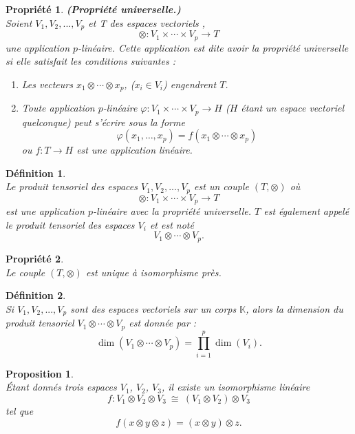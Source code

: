\documentclass[a4paper, 14pt]{report}
\newtheorem{definition}{Définition}[section]
\newtheorem{proposition}{Proposition}[section]
\newtheorem{propriety}{Propriété}[section]
\begin{document}
\begin{onehalfspace}
{\begin{propriety}\textbf{(Propriété universelle.)} \cite{greub2012linear}\\
Soient \( V_1, V_2, ... ,V_p \) et T des espaces vectoriels , 
	\[
	\otimes : V_1 \times \cdots \times V_p \to T
	\]
	une application \( p \)-linéaire. Cette application est dite avoir la \textit{propriété universelle} si elle satisfait les conditions suivantes :
	\begin{enumerate} [label=\roman*)]
		\item Les vecteurs \( x_1 \otimes \cdots \otimes x_p \), (\( x_i \in V_i \)) engendrent \( T \).
		\item Toute application \( p \)-linéaire \( \varphi : V_1 \times \cdots \times V_p \to H \) (\( H \) étant un espace vectoriel quelconque) peut s'écrire sous la forme
		\[
		\varphi(x_1, \ldots, x_p) = f(x_1 \otimes \cdots \otimes x_p)
		\]
		ou \( f : T \to H \) est une application linéaire.
	\end{enumerate}
\end{propriety}

\begin{definition} \cite{greub2012linear}\\
Le produit tensoriel des espaces \( V_1, V_2, ... ,V_p \) est un couple \( (T, \otimes) \) où
	\[
	\otimes : V_1 \times \cdots \times V_p \to T
	\]
	est une application \( p \)-linéaire avec la propriété universelle. \( T \) est également appelé le produit tensoriel des espaces \( V_i \) et est noté
	\[
	V_1 \otimes \cdots \otimes V_p.
	\]
\end{definition}

\begin{propriety} \cite{greub2012linear}\\
Le couple \( (T, \otimes) \) est unique à isomorphisme près.
\end{propriety}


\begin{definition} \cite{greub2012linear}\\
Si \( V_1, V_2, ... ,V_p \) sont des espaces vectoriels sur un corps \( \mathbb{K} \), alors la dimension du produit tensoriel \( V_1 \otimes \cdots \otimes V_p \) est donnée par :
	\[
	\dim(V_1 \otimes \cdots \otimes V_p) = \prod_{i=1}^p \dim(V_i).
	\]
\end{definition}



\begin{proposition}\cite{greub2012linear}\\
Étant donnés trois espaces \(V_1\), \(V_2\), \(V_3\), il existe un isomorphisme linéaire  
	\[
	f : V_1 \otimes V_2 \otimes V_3 \ \cong \ (V_1 \otimes V_2) \otimes V_3
	\]
	tel que
	\[
	f(x \otimes y \otimes z) = (x \otimes y) \otimes z.
	\]
\end{proposition}


}
\end{onehalfspace}
\end{document}
